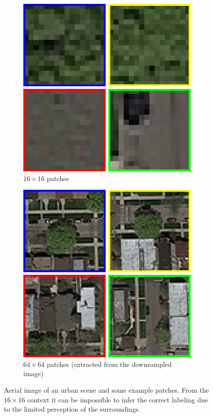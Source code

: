 \documentclass[10pt,conference,compsocconf]{IEEEtran}
\begin{document}
\begin{figure}
\begin{subfigure}[t]{.15\textwidth}
		\includegraphics[width=1\textwidth]{figs/context_size/context16}
		\caption{$ 16 \times 16 $ patches}
	\end{subfigure}
	\begin{subfigure}[t]{.15\textwidth}
		\includegraphics[width=1\textwidth]{figs/context_size/context64_ds}
		\caption{$ 64 \times 64 $ patches (extracted from the downsampled image)}
	\end{subfigure}
	\caption{Aerial image of an urban scene and some example patches. From the $ 16 \times 16 $ context it can be impossible to infer the correct labeling due to the limited perception of the surroundings.}
	\label{fig:context_size}
\end{figure}
\end{document}
